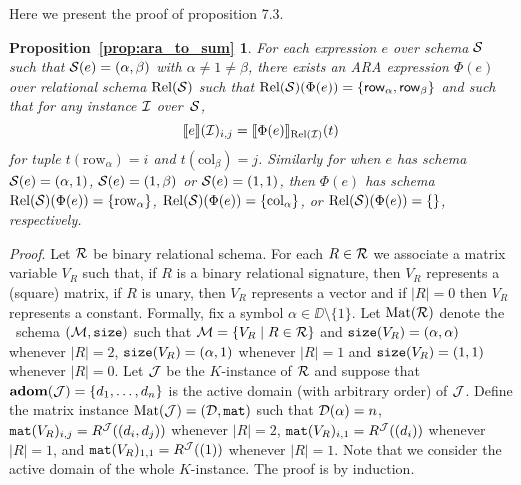 \newtheorem*{ARATOSUM}{Proposition~\ref{prop:ara_to_sum}}

Here we present the proof of proposition 7.3.

\begin{ARATOSUM}
  For each \langsum expression $e$ over schema $\mathcal{S}$ such that $\mathcal{S}(e)=(\alpha,\beta)$ with $\alpha\neq 1\neq\beta$, there exists an ARA expression $\Phi(e)$ over relational schema $\text{Rel}(\mathcal{S})$ such that $\text{Rel}(\mathcal{S})(\Phi(e))=\{\mathsf{row}_\alpha,\mathsf{row}_\beta\}$ and 
	such that for any instance $\mathcal{I}$ over~$\mathcal{S}$,
	$$
	\llbracket e \rrbracket(\mathcal{I})_{i,j}=\llbracket \Phi(e) \rrbracket_{\text{Rel}(\mathcal{I})}(t)
	$$
	for tuple $t(\mathrm{row}_\alpha)=i$ and $t(\mathrm{col}_\beta)=j$. Similarly for when $e$ has schema $\mathcal{S}(e)=(\alpha,1)$, $\mathcal{S}(e)=(1,\beta)$ or $\mathcal{S}(e)=(1,1)$, then $\Phi(e)$ has schema $\text{Rel}(\mathcal{S})(\Phi(e))=\{\mathrm{row}_\alpha\}$,
	$\text{Rel}(\mathcal{S})(\Phi(e))=\{\mathrm{col}_\alpha\}$, or
	$\text{Rel}(\mathcal{S})(\Phi(e))=\{\}$, respectively.
\end{ARATOSUM}

\textit{Proof}. Let $\mathcal{R}$ be binary relational schema. For each $R\in \mathcal{R}$ we associate a matrix variable 
$V_R$ such that, if $R$ is a binary relational signature, then $V_R$ represents a (square) matrix, 
if $R$ is unary, then $V_R$ represents a vector and if $|R|=0$ then $V_R$ represents a constant. Formally, 
fix a symbol $\alpha \in \DD \setminus \{1\}$. Let $\text{Mat}(\mathcal{R})$ denote the \lang \ schema
$(\mathcal{M},\texttt{size})$ such that $\mathcal{M} = \{ V_R \mid R \in \mathcal{R}\}$ and $\texttt{size}(V_R) = (\alpha, \alpha)$ 
whenever $|R| = 2$, $\texttt{size}(V_R) = (\alpha, 1)$ whenever $|R|=1$ and $\texttt{size}(V_R) = (1, 1)$ whenever $|R|=0$. 
Let $\mathcal{J}$ be the $K$-instance of $\mathcal{R}$ and suppose that $\mathbf{adom}(\mathcal{J}) = \{d_1, \ldots, d_n\}$ is 
the active domain (with arbitrary order) of $\mathcal{J}$. 
Define the matrix instance $\text{Mat}(\mathcal{J}) = (\mathcal{D},\texttt{mat})$ such 
that $\mathcal{D}(\alpha) = n$, $\texttt{mat}(V_R)_{i,j} = R^{\mathcal{J}}((d_i, d_j))$ whenever $|R|=2$, $\texttt{mat}(V_R)_{i,1} = R^{\mathcal{J}}((d_i))$ 
whenever $|R|=1$, and $\texttt{mat}(V_R)_{1,1} = R^{\mathcal{J}}((1))$ whenever $|R|=1$. 
Note that we consider the active domain of the whole $K$-instance.
The proof is by induction.

